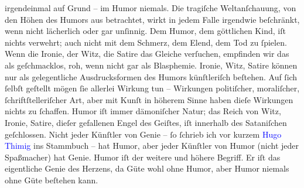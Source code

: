                   irgendeinmal auf Grund – im Humor niemals.\pend
           \pstart
           Die tragiſche Weltanſchauung, von den Höhen des Humors aus betrachtet, wirkt in
                  jedem Falle irgendwie beſchränkt, wenn nicht lächerlich oder gar unſinnig.\pend
           \pstart
           Dem Humor, dem göttlichen Kind, iſt nichts verwehrt; auch nicht mit dem Schmerz,
                  dem Elend, dem Tod zu ſpielen. Wenn die Ironie, der Witz, die Satire das Gleiche
                  verſuchen, empfinden wir das als geſchmacklos, roh, wenn nicht gar als
                  Blasphemie.\pend
           \pstart
           Ironie, Witz, Satire können nur als gelegentliche Ausdrucksformen des Humors
                  künſtleriſch beſtehen. Auf ſich ſelbſt geſtellt mögen ſie allerlei Wirkung tun –
                  Wirkungen politiſcher, moraliſcher, ſchriftſtelleriſcher Art, aber mit Kunſt in
                  höherem Sinne haben dieſe Wirkungen nichts zu ſchaffen.\pend
           \pstart
           Humor iſt immer dämoniſcher Natur; das Reich von Witz, Ironie, Satire, dieſer
                  gefallenen Engel des Geiſtes, iſt innerhalb des Sataniſchen geſchlossen.\pend
           \pstart
           Nicht jeder Künſtler von Genie – ſo ſchrieb ich vor kurzem \textcolor{blue}{Hugo Thimig}{}\ledrightnote{\textcolor{blue}{Hugo Thimig}} ins Stammbuch – hat Humor, aber jeder Künſtler
                  von Humor (nicht jeder Spaßmacher) hat Genie. Humor iſt der weitere und höhere
                  Begriff. Er iſt das eigentliche Genie des Herzens, da Güte wohl ohne Humor, aber
                  Humor niemals ohne Güte beſtehen kann.\pend
           \endnumbering{}  
      